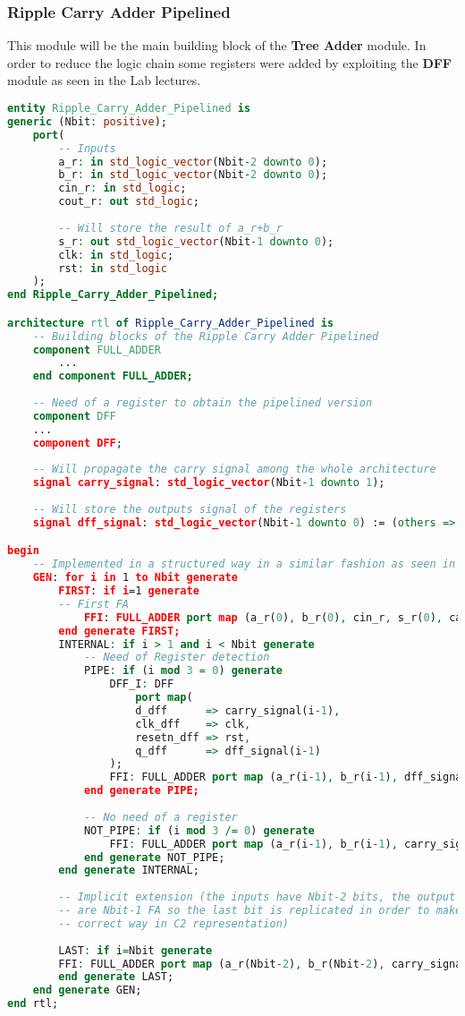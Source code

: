 \subsubsection{Ripple Carry Adder Pipelined}
This module will be the main building block of the \textbf{Tree Adder} module. In order to reduce the logic chain some registers were added by exploiting the \textbf{DFF} module as seen in the Lab lectures.
\begin{lstlisting}[language=VHDL]
entity Ripple_Carry_Adder_Pipelined is
generic (Nbit: positive);
	port(
		-- Inputs
		a_r: in std_logic_vector(Nbit-2 downto 0);
		b_r: in std_logic_vector(Nbit-2 downto 0);
		cin_r: in std_logic;
		cout_r: out std_logic;
		
		-- Will store the result of a_r+b_r
		s_r: out std_logic_vector(Nbit-1 downto 0);
		clk: in std_logic;
		rst: in std_logic
	);
end Ripple_Carry_Adder_Pipelined;

architecture rtl of Ripple_Carry_Adder_Pipelined is 
	-- Building blocks of the Ripple Carry Adder Pipelined 
	component FULL_ADDER
		...
	end component FULL_ADDER;
	
	-- Need of a register to obtain the pipelined version
	component DFF
	...
	component DFF;
	
	-- Will propagate the carry signal among the whole architecture  
	signal carry_signal: std_logic_vector(Nbit-1 downto 1);
	
	-- Will store the outputs signal of the registers
	signal dff_signal: std_logic_vector(Nbit-1 downto 0) := (others => '0');

begin
	-- Implemented in a structured way in a similar fashion as seen in the Lab lessions
	GEN: for i in 1 to Nbit generate
		FIRST: if i=1 generate
		-- First FA
			FFI: FULL_ADDER port map (a_r(0), b_r(0), cin_r, s_r(0), carry_signal(1));
		end generate FIRST;
		INTERNAL: if i > 1 and i < Nbit generate
			-- Need of Register detection
			PIPE: if (i mod 3 = 0) generate
				DFF_I: DFF
					port map(
					d_dff      => carry_signal(i-1),
					clk_dff    => clk,
					resetn_dff => rst,
					q_dff      => dff_signal(i-1)
				);
				FFI: FULL_ADDER port map (a_r(i-1), b_r(i-1), dff_signal(i-1), s_r(i-1), carry_signal(i));
			end generate PIPE;
			
			-- No need of a register
			NOT_PIPE: if (i mod 3 /= 0) generate
				FFI: FULL_ADDER port map (a_r(i-1), b_r(i-1), carry_signal(i-1), s_r(i-1), carry_signal(i));
			end generate NOT_PIPE;           
		end generate INTERNAL;
		
		-- Implicit extension (the inputs have Nbit-2 bits, the output has Nbit-1 bits and there
		-- are Nbit-1 FA so the last bit is replicated in order to make the extension in the 
		-- correct way in C2 representation)
		
		LAST: if i=Nbit generate
		FFI: FULL_ADDER port map (a_r(Nbit-2), b_r(Nbit-2), carry_signal(Nbit-1), s_r(Nbit-1), cout_r);
		end generate LAST;
	end generate GEN;
end rtl;

\end{lstlisting}

